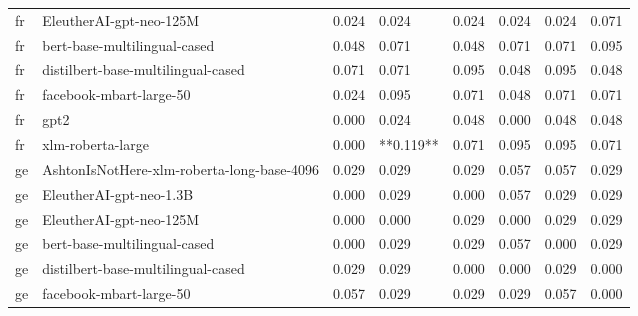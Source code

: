 \begin{tabular}{llllllll}
      fr &                    EleutherAI-gpt-neo-125M & 0.024 &                     0.024 &                 0.024 &                  0.024 &                                   0.024 &     0.071 \\
      fr &               bert-base-multilingual-cased & 0.048 &                     0.071 &                 0.048 &                  0.071 &                                   0.071 &     0.095 \\
      fr &         distilbert-base-multilingual-cased & 0.071 &                     0.071 &                 0.095 &                  0.048 &                                   0.095 &     0.048 \\
      fr &                    facebook-mbart-large-50 & 0.024 &                     0.095 &                 0.071 &                  0.048 &                                   0.071 &     0.071 \\
      fr &                                       gpt2 & 0.000 &                     0.024 &                 0.048 &                  0.000 &                                   0.048 &     0.048 \\
      fr &                          xlm-roberta-large & 0.000 &                 **0.119** &                 0.071 &                  0.095 &                                   0.095 &     0.071 \\
      ge & AshtonIsNotHere-xlm-roberta-long-base-4096 & 0.029 &                     0.029 &                 0.029 &                  0.057 &                                   0.057 &     0.029 \\
      ge &                    EleutherAI-gpt-neo-1.3B & 0.000 &                     0.029 &                 0.000 &                  0.057 &                                   0.029 &     0.029 \\
      ge &                    EleutherAI-gpt-neo-125M & 0.000 &                     0.000 &                 0.029 &                  0.000 &                                   0.029 &     0.029 \\
      ge &               bert-base-multilingual-cased & 0.000 &                     0.029 &                 0.029 &                  0.057 &                                   0.000 &     0.029 \\
      ge &         distilbert-base-multilingual-cased & 0.029 &                     0.029 &                 0.000 &                  0.000 &                                   0.029 &     0.000 \\
      ge &                    facebook-mbart-large-50 & 0.057 &                     0.029 &                 0.029 &                  0.029 &                                   0.057 &     0.000 \\

\end{tabular}
